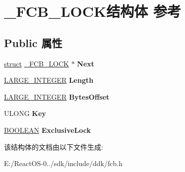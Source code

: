 \hypertarget{struct___f_c_b___l_o_c_k}{}\section{\+\_\+\+F\+C\+B\+\_\+\+L\+O\+C\+K结构体 参考}
\label{struct___f_c_b___l_o_c_k}
\subsection*{Public 属性}
\begin{DoxyCompactItemize}
\item 
\mbox{\label{struct___f_c_b___l_o_c_k_aa6bb2518903fe1445b5e6cf9a5ba5880}} 
\hyperlink{interfacestruct}{struct} \hyperlink{struct___f_c_b___l_o_c_k}{\+\_\+\+F\+C\+B\+\_\+\+L\+O\+CK} $\ast$ {\bfseries Next}
\item 
\mbox{\label{struct___f_c_b___l_o_c_k_a7ba14c0a7a8c4025c8a9eaa685d99386}} 
\hyperlink{union___l_a_r_g_e___i_n_t_e_g_e_r}{L\+A\+R\+G\+E\+\_\+\+I\+N\+T\+E\+G\+ER} {\bfseries Length}
\item 
\mbox{\label{struct___f_c_b___l_o_c_k_a25c7270b15d0c124a5f53c6de7fe577a}} 
\hyperlink{union___l_a_r_g_e___i_n_t_e_g_e_r}{L\+A\+R\+G\+E\+\_\+\+I\+N\+T\+E\+G\+ER} {\bfseries Bytes\+Offset}
\item 
\mbox{\label{struct___f_c_b___l_o_c_k_ac7bc9e491d4f2237b0c01ed1367d7c4c}} 
U\+L\+O\+NG {\bfseries Key}
\item 
\mbox{\label{struct___f_c_b___l_o_c_k_a517dfcb9deff62dba3262b75da72d153}} 
\hyperlink{_processor_bind_8h_a112e3146cb38b6ee95e64d85842e380a}{B\+O\+O\+L\+E\+AN} {\bfseries Exclusive\+Lock}
\end{DoxyCompactItemize}


该结构体的文档由以下文件生成\+:\begin{DoxyCompactItemize}
\item 
E\+:/\+React\+O\+S-\/0../sdk/include/ddk/fcb.\+h\end{DoxyCompactItemize}
